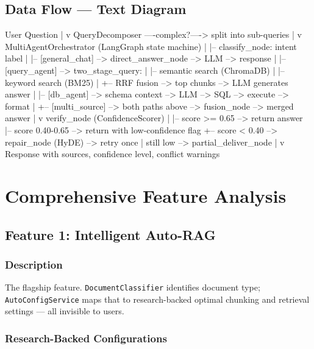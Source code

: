 \documentclass[12pt, a4paper, oneside]{report}
\newcommand{\kw}[1]{\texttt{\small #1}}
\begin{document}
\section{Data Flow — Text Diagram}

\begin{codebox}
User Question
    |
    v
QueryDecomposer ----complex?----> split into sub-queries
    |
    v
MultiAgentOrchestrator (LangGraph state machine)
    |
    |-- classify_node: intent label
    |
    |-- [general_chat]  --> direct_answer_node --> LLM --> response
    |
    |-- [query_agent]   --> two_stage_query:
    |       |-- semantic search (ChromaDB)
    |       |-- keyword search (BM25)
    |       +-- RRF fusion --> top chunks --> LLM generates answer
    |
    |-- [db_agent]      --> schema context --> LLM --> SQL --> execute --> format
    |
    +-- [multi_source]  --> both paths above --> fusion_node --> merged answer
    |
    v
verify_node (ConfidenceScorer)
    |
    |-- score >= 0.65  --> return answer
    |-- score 0.40-0.65 --> return with low-confidence flag
    +-- score < 0.40   --> repair_node (HyDE) --> retry once
                                    |
                               still low --> partial_deliver_node
    |
    v
Response with sources, confidence level, conflict warnings
\end{codebox}

\chapter{Comprehensive Feature Analysis}

\section{Feature 1: Intelligent Auto-RAG}

\subsection*{Description}
The flagship feature. \kw{DocumentClassifier} identifies document type; \kw{AutoConfigService}
maps that to research-backed optimal chunking and retrieval settings — all invisible to users.

\subsection*{Research-Backed Configurations}
\end{document}
